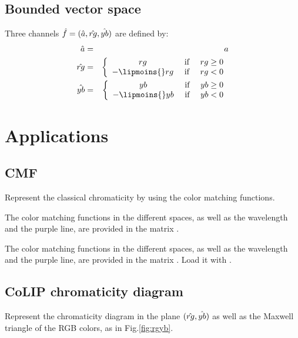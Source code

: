 \subsection{Bounded vector space}
Three channels $\mathop{\hat{f}}\nolimits=(\hat{a}, \hat{rg}, \hat{yb})$ are defined by:
\vspace*{-.8\baselineskip}
\begin{eqnarray}
  \h{a} &=&a\\
  \h{rg} &=&\left\{
    \begin{array}{cll}
        rg &\textrm{ if }& rg\geq 0\\
        -\lipmoins{} rg &\textrm{ if }& rg< 0
    \end{array} 
  \right. \\
  \h{yb} &=&\left\{
    \begin{array}{cll}
        yb &\textrm{ if }& yb\geq 0\\
        -\lipmoins{} yb &\textrm{ if }& yb< 0
    \end{array} 
  \right.
\end{eqnarray}

\section{Applications}
\subsection{CMF}
\begin{qbox}
Represent the classical chromaticity by using the color matching functions.
\end{qbox}
\begin{mcomment}
\begin{mremark}
	The color matching functions in the different spaces, as well as the wavelength and the purple line, are provided in the matrix .
\end{mremark}
\end{mcomment}

\begin{pcomment}
\begin{premark}
The color matching functions in the different spaces, as well as the wavelength and the purple line, are provided in the matrix . Load it with .
\end{premark}
\end{pcomment}

\newpage
\subsection{CoLIP chromaticity diagram}
\begin{qbox}
Represent the chromaticity diagram in the plane $(\mathop{\hat{rg}}\nolimits,\mathop{\hat{yb}}\nolimits)$ as well as the Maxwell triangle of the RGB colors, as in Fig.\ref{fig:rgyb}.
\end{qbox}

